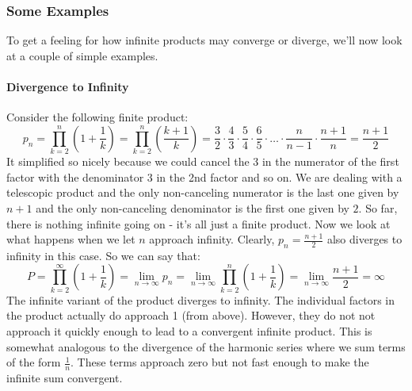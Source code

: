 

\subsubsection{Some Examples}
To get a feeling for how infinite products may converge or diverge, we'll now look at a couple of simple examples.

\paragraph{Divergence to Infinity}
Consider the following finite product:
\begin{equation}
 p_n = \prod_{k=2}^n  \left(1 + \frac{1}{k} \right)
     = \prod_{k=2}^n  \left(\frac{k + 1}{k} \right)
     = \frac{3}{2}   \cdot \frac{4}{3} \cdot \frac{5}{4} \cdot \frac{6}{5} 
       \cdot \ldots \cdot \frac{n}{n-1} \cdot \frac{n+1}{n}
     = \frac{n+1}{2}
\end{equation}
It simplified so nicely because we could cancel the 3 in the numerator of the first factor with the denominator 3 in the 2nd factor and so on. We are dealing with a telescopic product and the only non-canceling numerator is the last one given by $n+1$ and the only non-canceling denominator is the first one given by $2$. So far, there is nothing infinite going on - it's all just a finite product. Now we look at what happens when we let $n$ approach infinity. Clearly, $p_n = \frac{n+1}{2}$ also diverges to infinity in this case. So we can say that:
\begin{equation}
 P = \prod_{k=2}^{\infty} \left(1 + \frac{1}{k} \right)
   = \lim_{n \rightarrow \infty} p_n 
   = \lim_{n \rightarrow \infty} \prod_{k=2}^n  \left(1 + \frac{1}{k} \right)
   = \lim_{n \rightarrow \infty} \frac{n+1}{2} 
   = \infty
\end{equation}
The infinite variant of the product diverges to infinity. The individual factors in the product actually do approach 1 (from above). However, they do not not approach it quickly enough to lead to a convergent infinite product. This is somewhat analogous to the divergence of the harmonic series where we sum terms of the form $\frac{1}{n}$. These terms approach zero but not fast enough to make the infinite sum convergent.


